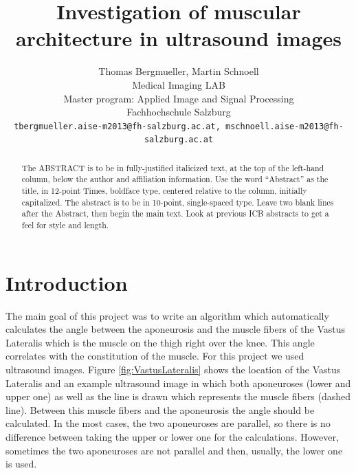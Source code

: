 \documentclass[10pt,twocolumn,letterpaper]{article}
\begin{document}
\title{Investigation of muscular architecture in ultrasound images}

\author{Thomas Bergmueller, Martin Schnoell\\
Medical Imaging LAB\\
Master program: Applied Image and Signal Processing\\
Fachhochschule Salzburg\\
{\tt\small tbergmueller.aise-m2013@fh-salzburg.ac.at, mschnoell.aise-m2013@fh-salzburg.ac.at}
}

\maketitle
\thispagestyle{empty}

\begin{abstract}
   The ABSTRACT is to be in fully-justified italicized text, at the top
   of the left-hand column, below the author and affiliation
   information. Use the word ``Abstract'' as the title, in 12-point
   Times, boldface type, centered relative to the column, initially
   capitalized. The abstract is to be in 10-point, single-spaced type.
   Leave two blank lines after the Abstract, then begin the main text.
   Look at previous ICB abstracts to get a feel for style and length.
\end{abstract}


\section{Introduction}
The main goal of this project was to write an algorithm which automatically calculates the angle between the aponeurosis and the muscle fibers of the Vastus Lateralis which is the muscle on the thigh right over the knee. This angle correlates with the constitution of the muscle.
For this project we used ultrasound images.  
Figure \ref{fig:VastusLateralis} shows the location of the Vastus Lateralis and an example ultrasound image in which both aponeuroses (lower and upper one) as well as the line is drawn which represents the muscle fibers (dashed line). Between this muscle fibers and the aponeurosis the angle should be calculated. In the most cases, the two aponeuroses are parallel, so there is no difference between taking the upper or lower one for the calculations. However, sometimes the two aponeuroses are not parallel and then, usually, the lower one is used. 
\end{document}
